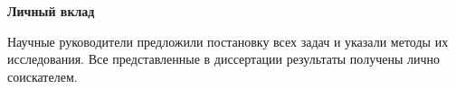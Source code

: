 
\textbf{Личный вклад}

Научные руководители предложили постановку всех задач и указали методы их исследования. Все представленные в диссертации результаты получены лично соискателем.
